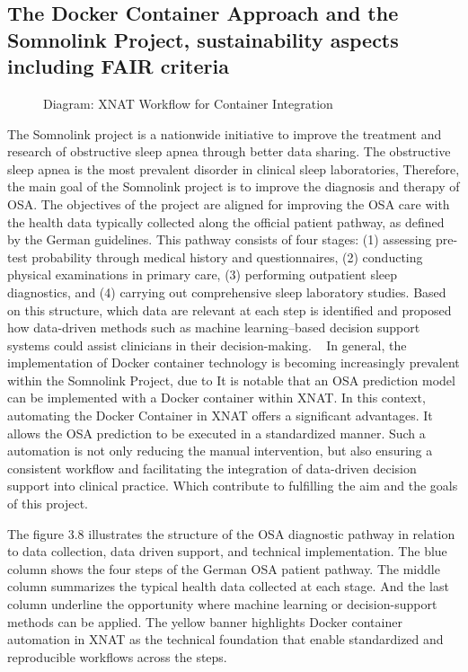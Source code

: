 \subsection{The Docker Container Approach and the Somnolink Project, sustainability aspects including FAIR criteria}
\begin{figure}[H]
    \centering
    \def\svgwidth{\linewidth} 
    
    \caption{Diagram: XNAT Workflow for Container Integration}
    \label{fig:workflowxnat}
\end{figure}

The Somnolink project is a nationwide initiative to improve the treatment and research of obstructive sleep apnea through better data sharing. The obstructive sleep apnea is the most prevalent disorder in clinical sleep laboratories, Therefore, the main goal of the Somnolink project is to improve the diagnosis and therapy of OSA.
The objectives of the project are aligned for improving the OSA care with the health data typically collected along the official patient pathway, as defined by the German guidelines. This pathway consists of four stages: (1) assessing pre-test probability through medical history and questionnaires, (2) conducting physical examinations in primary care, (3) performing outpatient sleep diagnostics, and (4) carrying out comprehensive sleep laboratory studies. Based on this structure, which data are relevant at each step is identified and proposed how data-driven methods such as machine learning–based decision support systems could assist clinicians in their decision-making. ~\cite{krefting_somnolink_2025}
In general, the implementation of Docker container technology is becoming increasingly prevalent within the Somnolink Project, due to It is notable that an OSA prediction model can be implemented with a Docker container within XNAT.
In this context, automating the Docker Container in XNAT offers a significant advantages. It allows the OSA prediction to be executed in a standardized manner. Such a automation is not only reducing the manual intervention, but also ensuring a consistent  workflow and facilitating  the integration of data-driven decision support into clinical practice. Which contribute to fulfilling the aim and the goals of this project.


The figure 3.8 illustrates the structure of the OSA diagnostic pathway in relation to data collection, data driven support, and technical implementation.
The blue column shows the four steps of the German OSA patient pathway. The middle column summarizes the typical health data collected at each stage. And the last column underline the opportunity where machine learning or decision-support methods can be applied. 
The yellow banner highlights Docker container automation in XNAT  as the technical foundation that enable standardized and reproducible workflows across the steps.

